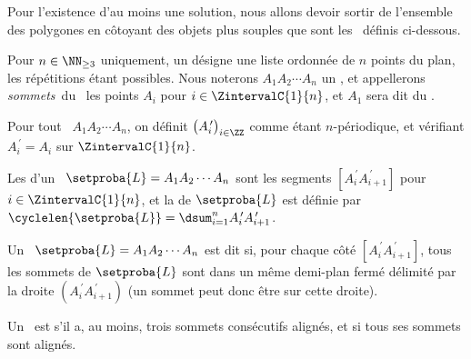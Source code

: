 Pour l'existence d'au moins une solution, nous allons devoir sortir de l'ensemble des polygones en côtoyant des objets plus souples que sont les \ncycles\ définis ci-dessous.




\begin{defi}
	Pour $n \in \NN_{\geq3}$ uniquement, un \focus{\ncycle} désigne une liste ordonnée de $n$ points du plan, les répétitions étant possibles.
	Nous noterons $A_1 A_2 \cdots A_n$ un \ncycle, 
	et appellerons 
	\og \emph{sommets}\fg\ du \ncycle\ les points $A_i$ pour $i \in \ZintervalC{1}{n}$,
	et $A_1$ sera dit  du \ncycle.
\end{defi}


\begin{defi}
    Pour tout \ncycle\ $A_1 A_2 \cdots A_n$, on définit $\big( A^{\,\prime}_i \big)_{i \in \ZZ}$ comme étant $n$-périodique, et vérifiant $A^{\,\prime}_{i} = A_i$ sur $\ZintervalC{1}{n}$.
\end{defi}


\begin{defi}
	Les  d'un \ncycle\ $\setproba{L} = A_1 A_2 \cdots A_n$ sont les segments
	$[A^{\,\prime}_i A^{\,\prime}_{i+1}]$ pour $i \in \ZintervalC{1}{n}$,
	et
	la  de $\setproba{L}$ est définie par $\cyclelen{\setproba{L}} = \dsum_{i=1}^{n} A^{\,\prime}_i A^{\,\prime}_{i+1}$.
\end{defi}


\begin{defi}
	Un \ncycle\ $\setproba{L} = A_1 A_2 \cdots A_n$ est dit  si, pour chaque côté $[A^{\,\prime}_i A^{\,\prime}_{i+1}]$, tous les sommets de $\setproba{L}$ sont dans un même demi-plan fermé délimité par la droite $(A^{\,\prime}_i A^{\,\prime}_{i+1})$ (un sommet peut donc être sur cette droite).
\end{defi}


\begin{defi}
	Un \ncycle\ est  s'il a, au moins, trois sommets consécutifs alignés,
	et
	 si tous ses sommets sont alignés.
\end{defi}


